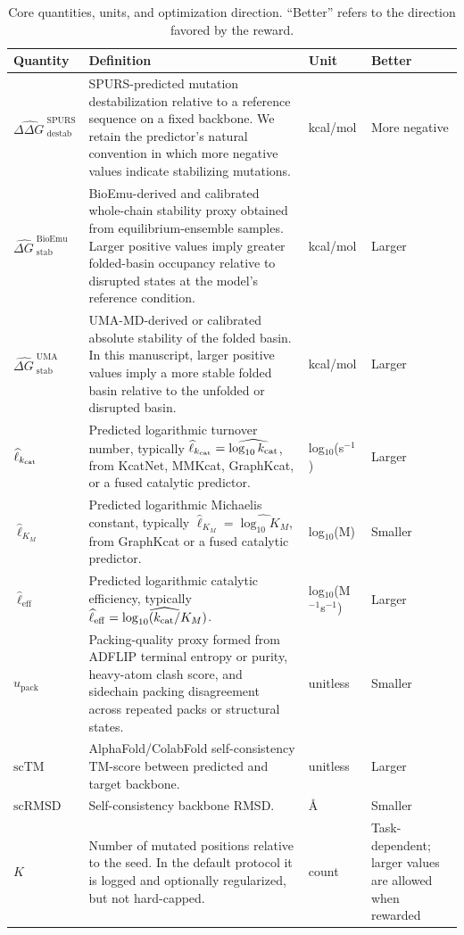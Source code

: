 \documentclass[11pt]{article}
\newcommand{\packunc}{\ensuremath{u_{\mathrm{pack}}}}
\newcommand{\scTM}{\ensuremath{\mathrm{scTM}}}
\newcommand{\scRMSD}{\ensuremath{\mathrm{scRMSD}}}
\newcommand{\angstrom}{\ensuremath{\text{\AA}}}
\newcommand{\ddG}{\ensuremath{\Delta\Delta G \ }}
\newcommand{\dG}{\ensuremath{\Delta G \ }}
\begin{document}
	\begin{table}[H]
		\centering
		\caption{Core quantities, units, and optimization direction. ``Better'' refers to the direction favored by the reward.}
		\label{tab:signs}
		\begin{tabularx}{\textwidth}{>{\raggedright\arraybackslash}p{} >{\raggedright\arraybackslash}p{} >{\raggedright\arraybackslash}p{} >{\raggedright\arraybackslash}X}
			\toprule
			Quantity & Definition & Unit & Better \\
			\midrule
			$\widehat{\ddG}^{\mathrm{SPURS}}_{\mathrm{destab}}$ & SPURS-predicted mutation destabilization relative to a reference sequence on a fixed backbone. We retain the predictor's natural convention in which more negative values indicate stabilizing mutations. & kcal/mol & More negative \\
			$\widehat{\dG}^{\mathrm{BioEmu}}_{\mathrm{stab}}$ & BioEmu-derived and calibrated whole-chain stability proxy obtained from equilibrium-ensemble samples. Larger positive values imply greater folded-basin occupancy relative to disrupted states at the model's reference condition. & kcal/mol & Larger \\
			$\widehat{\dG}^{\mathrm{UMA}}_{\mathrm{stab}}$ & UMA-MD-derived or calibrated absolute stability of the folded basin. In this manuscript, larger positive values imply a more stable folded basin relative to the unfolded or disrupted basin. & kcal/mol & Larger \\
			$\widehat \ell_{k_{\rm cat}}$ & Predicted logarithmic turnover number, typically $\widehat \ell_{k_{\rm cat}}=\widehat{\log_{10} k_{\rm cat}}$, from KcatNet, MMKcat, GraphKcat, or a fused catalytic predictor. & log$_{10}$(s$^{-1}$) & Larger \\
			$\widehat \ell_{K_M}$ & Predicted logarithmic Michaelis constant, typically $\widehat \ell_{K_M}=\widehat{\log_{10} K_M}$, from GraphKcat or a fused catalytic predictor. & log$_{10}$(M) & Smaller \\
			$\widehat \ell_{\mathrm{eff}}$ & Predicted logarithmic catalytic efficiency, typically $\widehat \ell_{\mathrm{eff}}=\widehat{\log_{10}(k_{\rm cat}/K_M)}$. & log$_{10}$(M$^{-1}$s$^{-1}$) & Larger \\
			$\packunc$ & Packing-quality proxy formed from ADFLIP terminal entropy or purity, heavy-atom clash score, and sidechain packing disagreement across repeated packs or structural states. & unitless & Smaller \\
			$\scTM$ & AlphaFold/ColabFold self-consistency TM-score between predicted and target backbone. & unitless & Larger \\
			$\scRMSD$ & Self-consistency backbone RMSD. & \angstrom & Smaller \\
			$K$ & Number of mutated positions relative to the seed. In the default protocol it is logged and optionally regularized, but not hard-capped. & count & Task-dependent; larger values are allowed when rewarded \\
			\bottomrule
		\end{tabularx}
	\end{table}
	
\end{document}
